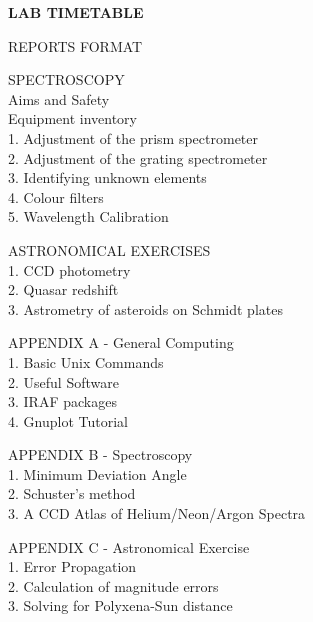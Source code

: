 \documentclass[12pt]{article}
\begin{document}
{\bf
LAB TIMETABLE

REPORTS FORMAT

SPECTROSCOPY \\
\hspace*{2cm} Aims and Safety \\
\hspace*{2cm} Equipment inventory\\
\hspace*{2cm}1. Adjustment of the prism spectrometer\\
\hspace*{2cm}2. Adjustment of the grating spectrometer\\
\hspace*{2cm}3. Identifying unknown elements\\
\hspace*{2cm}4. Colour filters\\
\hspace*{2cm}5. Wavelength Calibration

ASTRONOMICAL EXERCISES \\
\hspace*{2cm}1. CCD photometry\\
\hspace*{2cm}2. Quasar redshift \\
\hspace*{2cm}3. Astrometry of asteroids on Schmidt plates

APPENDIX A - General Computing\\
\hspace*{2cm}1. Basic Unix Commands\\
\hspace*{2cm}2. Useful Software\\
\hspace*{2cm}3. IRAF packages\\
\hspace*{2cm}4. Gnuplot Tutorial

APPENDIX B - Spectroscopy\\
\hspace*{2cm}1. Minimum Deviation Angle\\
\hspace*{2cm}2. Schuster's method\\
\hspace*{2cm}3. A CCD Atlas of Helium/Neon/Argon Spectra

APPENDIX C - Astronomical Exercise\\
\hspace*{2cm}1. Error Propagation\\
\hspace*{2cm}2. Calculation of magnitude errors\\
\hspace*{2cm}3. Solving for Polyxena-Sun distance


}
\end{document}
